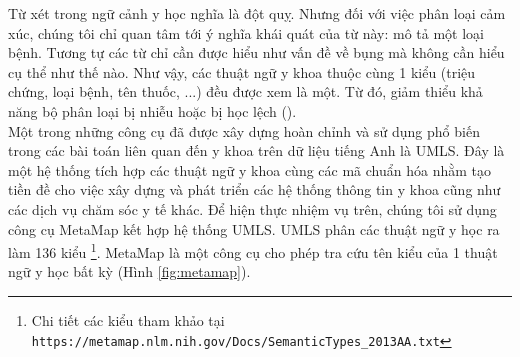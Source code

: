 Từ  xét trong ngữ cảnh y học nghĩa là đột quỵ. Nhưng đối với việc phân loại cảm xúc, chúng tôi chỉ quan tâm tới ý nghĩa khái quát của từ này:  mô tả một loại bệnh. Tương tự các từ  chỉ cần được hiểu như vấn đề về bụng mà không cần hiểu cụ thể như thế nào. Như vậy, các thuật ngữ y khoa thuộc cùng 1 kiểu (triệu chứng, loại bệnh, tên thuốc, ...) đều được xem là một. Từ đó, giảm thiểu khả năng bộ phân loại bị nhiễu hoặc bị học lệch ().\\

Một trong những công cụ đã được xây dựng hoàn chỉnh và sử dụng phổ biến trong các bài toán liên quan đến y khoa trên dữ liệu tiếng Anh là UMLS. Đây là một hệ thống tích hợp các thuật ngữ y khoa cùng các mã chuẩn hóa nhằm tạo tiền đề cho việc xây dựng và phát triển các hệ thống thông tin y khoa cũng như các dịch vụ chăm sóc y tế khác. Để hiện thực nhiệm vụ trên, chúng tôi sử dụng công cụ MetaMap kết hợp hệ thống UMLS. UMLS phân các thuật ngữ y học ra làm 136 kiểu \footnote{Chi tiết các kiểu tham khảo tại \texttt{https://metamap.nlm.nih.gov/Docs/SemanticTypes\_2013AA.txt}}. MetaMap là một công cụ cho phép tra cứu tên kiểu của 1 thuật ngữ y học bất kỳ (Hình \ref{fig:metamap}).\\

